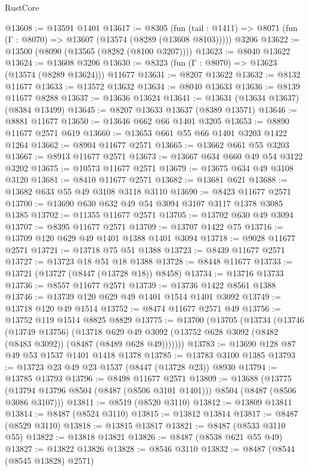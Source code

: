 \begin{lexlean}{RustCore}
\begin{coremodule}
@13608 := @13591 @1401
@13617 := @8305
    (fun (tail : @1411) => @8071 (fun (Γ : @8070) => @13607 (@13574 (@8289 (@13608 @8103)))))
    @3206
@13622 := @13500 (@8090 (@13565 (@8282 (@8100 @3207))))
@13623 := @8040 @13622
@13624 := @13608 @3206
@13630 := @8323 (fun (Γ : @8070) => @13623 (@13574 (@8289 @13624))) @11677
@13631 := @8207 @13622
@13632 := @8132 @11677
@13633 := @13572 @13632
@13634 := @8040 @13633
@13636 := @8139 @11677 @8288
@13637 := @13636 @13624
@13641 := @13631 (@13634 @13637) (@8384 @13499)
@13645 := @8207 @13633 @13637 (@8389 @13571)
@13646 := @8881 @11677
@13650 := @13646 @662 @66 @1401 @3205
@13653 := @8890 @11677 @2571 @619
@13660 := @13653 @661 @55 @66 @1401 @3203 @1422 @1264
@13662 := @8904 @11677 @2571
@13665 := @13662 @661 @55 @3203
@13667 := @8913 @11677 @2571
@13673 := @13667 @634 @660 @49 @54 @3122 @3202
@13675 := @10573 @11677 @2571
@13679 := @13675 @634 @49 @3108 @3120
@13681 := @8410 @11677 @2571
@13682 := @13681 @621
@13688 := @13682 @633 @55 @49 @3108 @3118 @3110
@13690 := @8423 @11677 @2571
@13700 := @13690 @630 @632 @49 @54 @3094 @3107 @3117 @1378 @3085 @1385
@13702 := @11355 @11677 @2571
@13705 := @13702 @630 @49 @3094
@13707 := @8395 @11677 @2571
@13709 := @13707 @1422 @75
@13716 := @13709 @120 @629 @49 @1401 @1388 @1401 @3094
@13718 := @9028 @11677 @2571
@13721 := @13718 @75 @51 @1388
@13723 := @8439 @11677 @2571
@13727 := @13723 @18 @51 @18 @1388
@13728 := @8448 @11677
@13733 := @13721 (@13727 (@8447 (@13728 @18)) @8458)
@13734 := @13716 @13733
@13736 := @8557 @11677 @2571
@13739 := @13736 @1422 @8561 @1388
@13746 := @13739 @120 @629 @49 @1401 @1514 @1401 @3092
@13749 := @13718 @120 @49 @1514
@13752 := @8474 @11677 @2571 @49
@13756 := @13752 @119 @1514 @8825 @8829
@13775 := @13700
    (@13705
      (@13734
        (@13746
          (@13749 @13756)
          (@13718
            @629
            @49
            @3092
            (@13752 @628 @3092 (@8482 (@8483 @3092)) (@8487 (@8489 @628 @49)))))))
@13783 := @13690 @128 @87 @49 @53 @1537 @1401 @1418 @1378
@13785 := @13783 @3100 @1385
@13793 := @13723 @23 @49 @23 @1537 (@8447 (@13728 @23)) @8930
@13794 := @13785 @13793
@13796 := @8498 @11677 @2571
@13809 := @13688
    (@13775 (@13794 @13796 @8504 (@8487 (@8506 @3101 @1401))) @8504 (@8487 (@8506 @3086 @3107)))
@13811 := @8519 (@8520 @3110)
@13812 := @13809 @13811
@13814 := @8487 (@8524 @3110)
@13815 := @13812 @13814
@13817 := @8487 (@8529 @3110)
@13818 := @13815 @13817
@13821 := @8487 (@8533 @3110 @55)
@13822 := @13818 @13821
@13826 := @8487 (@8538 @621 @55 @49)
@13827 := @13822 @13826
@13828 := @8546 @3110
@13832 := @8487 (@8544 (@8545 @13828) @2571)

\end{coremodule}
\end{lexlean}
